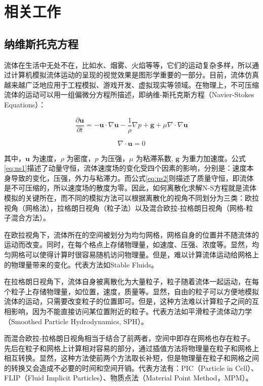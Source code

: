 \section{相关工作}
\subsection{纳维斯托克方程}

    流体在生活中无处不在，比如水、烟雾、火焰等等，它们的运动复杂多样，所以通过计算机模拟流体运动的呈现的视觉效果是图形学重要的一部分。目前，流体仿真越来越广泛地应用于工程模拟、游戏开发、虚拟现实等领域。在物理上，不可压缩流体的运动可以用一组偏微分方程所描述，即纳维-斯托克斯方程（Navier-Stokes Equations）\cite{BM07Fluid, B15Fluid}：

    \begin{equation}\label{eq:ns1}
    	\frac{\partial \mathbf{u}}{\partial t} = -\mathbf{u} \cdot \nabla \mathbf{u} - \frac {1}{\rho} \nabla p + \mathbf{g} + \mu \nabla \cdot \nabla \mathbf{u}
    \end{equation}
    
    \begin{equation}\label{eq:ns2}
    	\nabla \cdot \mathbf{u} = 0
    \end{equation}

    其中，$\mathbf{u}$ 为速度，$\rho$ 为密度，$p$ 为压强，$\mu$ 为粘滞系数, $\mathbf{g}$ 为重力加速度。公式\ref{eq:ns1}描述了动量守恒，流体速度场的变化受四个因素的影响，分别是：速度本身导致的变化，压强，外力与粘滞力。而公式\ref{eq:ns2}则描述了质量守恒，即流体是不可压缩的，所以速度场的散度为零。因此，如何离散化求解N-S方程就是流体模拟的关键所在，而不同的模拟方法可以根据离散化的视角不同划分为三类：欧拉视角（网格法），拉格朗日视角（粒子法）以及混合欧拉-拉格朗日视角（网格-粒子混合方法）。

    在欧拉视角下，流体所在的空间被划分为均匀网格，网格自身的位置并不随流体的运动而改变。同时，在每个格点上存储物理量，如速度、压强、浓度等。显然，均匀网格可以使得计算时很容易随机访问物理量。但是，难以计算流体运动给网格上的物理量带来的变化。代表方法如Stable Fluids\cite{FSJ01Somke, S99EM}。

    在拉格朗日视角下，流体自身被离散化为大量粒子，粒子随着流体一起运动，在每个粒子上存储物理量，如位置，速度，质量等。显然，自由的粒子可以方便地模拟流体的运动，只需要改变粒子的位置即可。但是，这种方法难以计算粒子之间的互相影响，因为不能直接访问某位置附近的粒子。代表方法如平滑粒子流体动力学（Smoothed Particle Hydrodynamics, SPH）\cite{M92SPH}。

    而混合欧拉-拉格朗日视角相当于结合了前两者，空间中即存在网格也存在粒子。先后在粒子和网格上计算相对容易的部分，通过插值方法将物理量在粒子和网格上相互转换。显然，这种方法使前两个方法取长补短，但是物理量在粒子和网格之间的转换又会造成不必要的时间和空间开销。代表方法有：PIC（Particle in Cell）\cite{H62PIC}、FLIP（Fluid Implicit Particles）\cite{BR86FLIP}、物质点法（Material Point Method，MPM）\cite{JST16MPM}。

